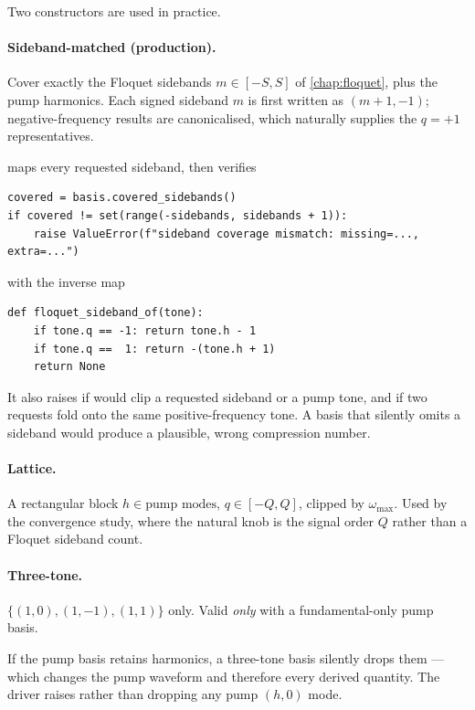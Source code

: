 Two constructors are used in practice.

\paragraph{Sideband-matched (production).} Cover exactly the Floquet sidebands
$m\in[-S,S]$ of \cref{chap:floquet}, plus the pump harmonics. Each signed
sideband $m$ is first written as $(m+1,-1)$; negative-frequency results are
canonicalised, which naturally supplies the $q=+1$ representatives.

\begin{implnote}
 maps every requested sideband, then
verifies
\begin{lstlisting}
covered = basis.covered_sidebands()
if covered != set(range(-sidebands, sidebands + 1)):
    raise ValueError(f"sideband coverage mismatch: missing=..., extra=...")
\end{lstlisting}
with the inverse map
\begin{lstlisting}
def floquet_sideband_of(tone):
    if tone.q == -1: return tone.h - 1
    if tone.q ==  1: return -(tone.h + 1)
    return None
\end{lstlisting}
It also raises if  would clip a requested sideband or a pump
tone, and if two requests fold onto the same positive-frequency tone. A basis
that silently omits a sideband would produce a plausible, wrong compression
number.
\end{implnote}

\paragraph{Lattice.} A rectangular block $h\in\text{pump modes}$,
$q\in[-Q,Q]$, clipped by $\omega_{\max}$. Used by the convergence study, where
the natural knob is the signal order $Q$ rather than a Floquet sideband count.

\paragraph{Three-tone.} $\{(1,0),(1,-1),(1,1)\}$ only. Valid \emph{only} with a
fundamental-only pump basis.

\begin{caveat}
If the pump basis retains harmonics, a three-tone basis silently drops them ---
which changes the pump waveform and therefore every derived quantity. The driver
raises rather than dropping any pump $(h,0)$ mode.
\end{caveat}

